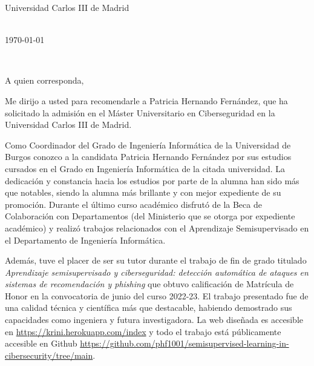 \documentclass[11pt,a4paper]{letter} %
\def\opening#1{\thispagestyle{empty}
{\centering\fromaddress \vspace{0.6in} \\ %
\hspace*{\longindentation}\today\hspace*{\fill}\par} %
{\raggedright \toname \\ \toaddress \par} %
\vspace{0.4in} %
\noindent #1 %
}
\begin{document}

\begin{letter}
{Universidad Carlos III de Madrid
}


\opening{A quien corresponda,}

Me dirijo a usted para recomendarle a Patricia Hernando Fernández, que ha solicitado la admisión en el Máster Universitario en Ciberseguridad en la Universidad Carlos III de Madrid.

Como Coordinador del Grado de Ingeniería Informática de la Universidad de Burgos conozco a la candidata Patricia Hernando Fernández por sus estudios cursados en el Grado en Ingeniería Informática de la citada universidad. La dedicación y constancia hacia los estudios por parte de la alumna han sido más que notables, siendo la alumna más brillante y con mejor expediente de su promoción. Durante el último curso académico disfrutó de la Beca de Colaboración con Departamentos (del Ministerio que se otorga por expediente académico) y realizó trabajos relacionados con el Aprendizaje Semisupervisado en el Departamento de Ingeniería Informática.

Además, tuve el placer de ser su tutor durante el trabajo de fin de grado titulado \textit{Aprendizaje semisupervisado y ciberseguridad: detección automática de ataques en sistemas de recomendación y phishing} que obtuvo calificación de Matrícula de Honor en la convocatoria de junio del curso 2022-23. El trabajo presentado fue de una calidad técnica y científica más que destacable, habiendo demostrado sus capacidades como ingeniera y futura investigadora. La web diseñada es accesible en \url{https://krini.herokuapp.com/index} y todo el trabajo está públicamente accesible en Github \url{https://github.com/phf1001/semisupervised-learning-in-cibersecurity/tree/main}.


\end{letter}
\end{document}

